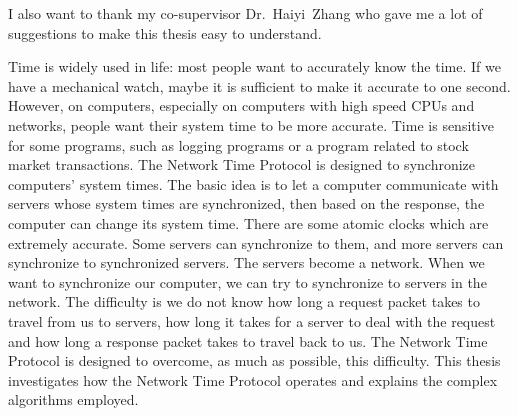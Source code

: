 I also want to thank my co-supervisor Dr.~Haiyi~Zhang who gave me a lot of
suggestions to make this thesis easy to understand.



\tocAndSuch



Time is widely used in life: most people want to accurately know the time. If
we have a mechanical watch, maybe it is sufficient to make it accurate to one
second. However, on computers, especially on computers with high speed CPUs and
networks, people want their system time to be more accurate.  Time is sensitive
for some programs, such as logging programs or a program related to stock
market transactions. The Network Time Protocol is designed to synchronize
computers' system times. The basic idea is to let a computer communicate with
servers whose system times are synchronized, then based on the response, the
computer can change its system time. There are some atomic clocks which are
extremely accurate. Some servers can synchronize to them, and more servers can
synchronize to synchronized servers. The servers become a network.  When we
want to synchronize our computer, we can try to synchronize to servers in the
network.  The difficulty is we do not know how long a request packet takes to
travel from us to servers, how long it takes for a server to deal with the
request and how long a response packet takes to travel back to us. The Network
Time Protocol is designed to overcome, as much as possible, this difficulty.
This thesis investigates how the Network Time Protocol operates and explains
the complex algorithms employed.

\afterpreface
